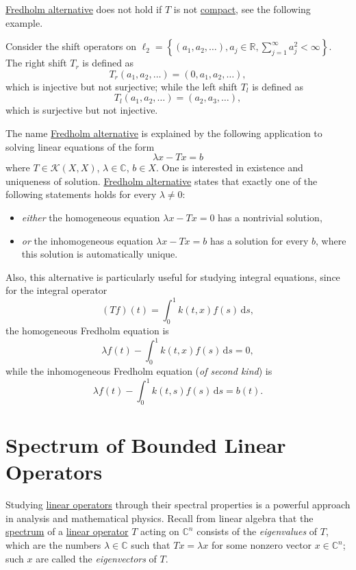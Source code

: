 \hyperref[thm:Fredholm-alternative]{Fredholm alternative} does not hold if \(T\) is not \hyperref[def:compact-op]{compact}, see the following example.
\begin{eg}
	Consider the shift operators on \(\ell _2 = \left\{ (a_1, a_2, \ldots ), a_j\in \mathbb{R}, \sum_{j=1}^{\infty}  a_j^2 < \infty \right\} \). The right shift \(T_r\) is defined as
	\[
		T_r(a_1, a_2, \ldots) = (0, a_1, a_2, \ldots ),
	\]
	which is injective but not surjective; while the left shift \(T_l\) is defined as
	\[
		T_l(a_1, a_2, \ldots ) = (a_2, a_3, \ldots ),
	\]
	which is surjective but not injective.
\end{eg}

The name \hyperref[thm:Fredholm-alternative]{Fredholm alternative} is explained by the following application to solving linear equations of the form
\[
	\lambda x - Tx = b
\]
where \(T\in \mathcal{K} (X, X)\), \(\lambda \in \mathbb{C} \), \(b\in X\). One is interested in existence and uniqueness of solution. \hyperref[thm:Fredholm-alternative]{Fredholm alternative} states that exactly one of the following statements holds for every \(\lambda \neq 0\):
\begin{itemize}
	\item \emph{either} the homogeneous equation \(\lambda x - Tx = 0\) has a nontrivial solution,
	\item \emph{or} the inhomogeneous equation \(\lambda x - Tx = b\) has a solution for every \(b\), where this solution is automatically unique.
\end{itemize}

Also, this alternative is particularly useful for studying integral equations, since for the integral operator
\[
	(Tf)(t) = \int_{0}^{1} k(t, x)f(s) \,\mathrm{d}s ,
\]
the homogeneous Fredholm equation is
\[
	\lambda f(t) - \int_{0}^{1} k(t, x)f(s) \,\mathrm{d}s = 0,
\]
while the inhomogeneous Fredholm equation (\emph{of second kind}) is
\[
	\lambda f(t) - \int_{0}^{1} k(t, s) f(s) \,\mathrm{d}s = b(t).
\]

\section{Spectrum of Bounded Linear Operators}
Studying \hyperref[def:linear-op]{linear operators} through their spectral properties is a powerful approach in analysis and mathematical physics. Recall from linear algebra that the \hyperref[def:spectrum-point]{spectrum} of a \hyperref[def:linear-op]{linear operator} \(T\) acting on \(\mathbb{C} ^n\) consists of the \emph{eigenvalues} of \(T\), which are the numbers \(\lambda \in \mathbb{C} \) such that \(Tx = \lambda x\) for some nonzero vector \(x\in \mathbb{C} ^n\); such \(x\) are called the \emph{eigenvectors} of \(T\).

